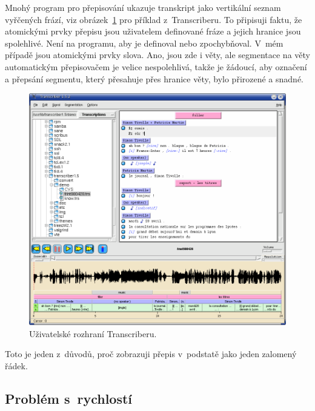 Mnohý program pro přepisování ukazuje transkript jako vertikální seznam
vyřčených frází,
viz obrázek~\ref{fig:transcriber} pro příklad z~Transcriberu. To připisuji faktu,
že atomickými prvky přepisu jsou uživatelem definované fráze a jejich hranice
jsou spolehlivé. Není na programu, aby je definoval nebo
zpochybňoval. V~mém případě jsou atomickými prvky slova. Ano, jsou zde i věty,
ale segmentace na věty automatickým přepisovačem je velice nespolehlivá, takže
je žádoucí, aby označení a přepsání segmentu, který přesahuje přes hranice věty,
bylo přirozené a snadné.

\begin{figure}[htpb]
\includegraphics[scale=0.46]{rc/transcriber1.png}
\caption{Uživatelské rozhraní Transcriberu.}
\label{fig:transcriber}
\end{figure}

Toto je jeden z~důvodů, proč zobrazuji přepis v~podstatě jako jeden zalomený
řádek.

\subsection{Problém s~rychlostí}

